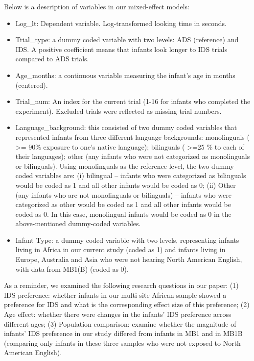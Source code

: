 \documentclass[
  english,
  ,man,floatsintext]{apa6}
\providecommand{\tightlist}{%
  \setlength{\itemsep}{0pt}\setlength{\parskip}{0pt}}
\begin{document}
Below is a description of variables in our mixed-effect models:

\begin{itemize}
\tightlist
\item
  Log\_lt: Dependent variable. Log-transformed looking time in seconds.
\item
  Trial\_type: a dummy coded variable with two levels: ADS (reference) and IDS. A positive coefficient means that infants look longer to IDS trials compared to ADS trials.
\item
  Age\_months: a continuous variable measuring the infant's age in months (centered).
\item
  Trial\_num: An index for the current trial (1-16 for infants who completed the experiment). Excluded trials were reflected as missing trial numbers.
\item
  Language\_background: this consisted of two dummy coded variables that represented infants from three different language backgrounds: monolinguals ( \textgreater= 90\% exposure to one's native language); bilinguals ( \textgreater=25 \% to each of their languages); other (any infants who were not categorized as monolinguals or bilinguals). Using monolinguals as the reference level, the two dummy-coded variables are: (i) bilingual -- infants who were categorized as bilinguals would be coded as 1 and all other infants would be coded as 0; (ii) Other (any infants who are not monolinguals or bilinguals) -- infants who were categorized as other would be coded as 1 and all other infants would be coded as 0. In this case, monolingual infants would be coded as 0 in the above-mentioned dummy-coded variables.
\item
  Infant Type: a dummy coded variable with two levels, representing infants living in Africa in our current study (coded as 1) and infants living in Europe, Australia and Asia who were not hearing North American English, with data from MB1(B) (coded as 0).
\end{itemize}

As a reminder, we examined the following research questions in our paper: (1) IDS preference: whether infants in our multi-site African sample showed a preference for IDS and what is the corresponding effect size of this preference; (2) Age effect: whether there were changes in the infants' IDS preference across different ages; (3) Population comparison: examine whether the magnitude of infants' IDS preference in our study differed from infants in MB1 and in MB1B (comparing only infants in these three samples who were not exposed to North American English).
\end{document}
